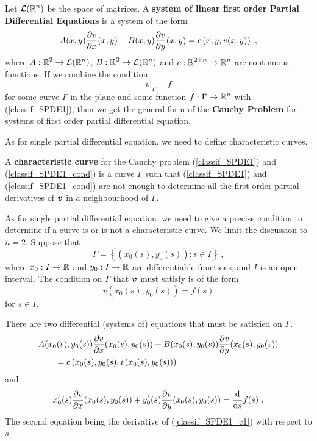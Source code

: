 Let $\displaystyle \LL(\RR^n)$ be the space of \nn matrices.  A
{\bfseries system of linear first order Partial Differential Equations}%
 is
a system of the form
\begin{equation} \label{classif_SPDE1}
A(x,y) \pdydx{v}{x}(x,y) + B(x,y) \pdydx{v}{y}(x,y) =
c\left(x,y,v(x,y)\right) \ ,
\end{equation}
where $\displaystyle A:\RR^2\rightarrow \LL(\RR^n)$,
$\displaystyle B:\RR^2\rightarrow \LL(\RR^n)$ and
$\displaystyle c:\RR^{2+n}\rightarrow \RR^n$ are continuous functions.
If we combine the condition
\begin{equation} \label{classif_SPDE1_cond}
v\big|_\Gamma = f
\end{equation}
for some curve $\Gamma$ in the plane and some function
$\displaystyle f:\Gamma \rightarrow \RR^n$ with
(\ref{classif_SPDE1}), then we get the general form of the
{\bfseries Cauchy Problem} for systems of first
order partial differential equation. 

As for single partial differential equation, we need to define
characteristic curves.

\begin{defn}
A {\bfseries characteristic curve} for the
Cauchy problem (\ref{classif_SPDE1}) and (\ref{classif_SPDE1_cond}) is a
curve $\Gamma$ such that (\ref{classif_SPDE1}) and
(\ref{classif_SPDE1_cond}) are not enough to determine all
the first order partial derivatives of $\VEC{v}$ in a neighbourhood of
$\Gamma$.
\end{defn}

As for single partial differential equation, we need to give a precise
condition to determine if a curve is or is not a characteristic curve.
We limit the discussion to $n=2$. Suppose that
\begin{equation} \label{classif_GammaEq2}
\Gamma = \left\{ (x_0(s), y_0(s)) : s \in I \right\} \ ,
\end{equation}
where $x_0:I\rightarrow \RR$ and $y_0:I\rightarrow \RR$ are
differentiable functions, and $I$ is an open interval.  The condition
on $\Gamma$ that $\VEC{v}$ must satisfy is of the form
\begin{equation} \label{classif_SPDE1_c1}
v(x_0(s),y_0(s)) = f(s)
\end{equation}
for $s\in I$.

There are two differential (systems of) equations that must be
satisfied on $\Gamma$.
\begin{equation} \label{classif_SPDE1_c2}
\begin{split}
&A(x_0(s),y_0(s)) \pdydx{v}{x}(x_0(s),y_0(s)) + B(x_0(s),y_0(s))
\pdydx{v}{y}(x_0(s),y_0(s)) \\
&\qquad =c\left(x_0(s),y_0(s),v(x_0(s),y_0(s))\right)
\end{split}
\end{equation}
and
\begin{equation} \label{classif_SPDE1_c3}
x_0'(s)\pdydx{v}{x}(x_0(s),y_0(s)) +
y_0'(s)\pdydx{v}{y}(x_0(s),y_0(s)) = \dfdx{f}{s}(s) \ .
\end{equation}
The second equation being the derivative of (\ref{classif_SPDE1_c1})
with respect to $s$.

